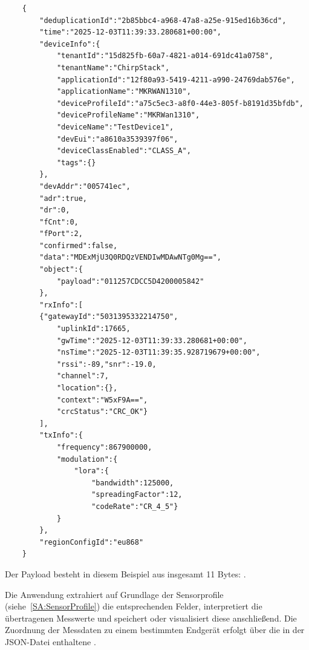 \begin{verbatim}
	{
		"deduplicationId":"2b85bbc4-a968-47a8-a25e-915ed16b36cd",
		"time":"2025-12-03T11:39:33.280681+00:00",
		"deviceInfo":{
			"tenantId":"15d825fb-60a7-4821-a014-691dc41a0758",
			"tenantName":"ChirpStack",
			"applicationId":"12f80a93-5419-4211-a990-24769dab576e",
			"applicationName":"MKRWAN1310",
			"deviceProfileId":"a75c5ec3-a8f0-44e3-805f-b8191d35bfdb",
			"deviceProfileName":"MKRWan1310",
			"deviceName":"TestDevice1",
			"devEui":"a8610a3539397f06",
			"deviceClassEnabled":"CLASS_A",
			"tags":{}
		},
		"devAddr":"005741ec",
		"adr":true,
		"dr":0,
		"fCnt":0,
		"fPort":2,
		"confirmed":false,
		"data":"MDExMjU3Q0RDQzVENDIwMDAwNTg0Mg==",
		"object":{
			"payload":"011257CDCC5D4200005842"
		},
		"rxInfo":[
		{"gatewayId":"5031395332214750",
			"uplinkId":17665,
			"gwTime":"2025-12-03T11:39:33.280681+00:00",
			"nsTime":"2025-12-03T11:39:35.928719679+00:00",
			"rssi":-89,"snr":-19.0,
			"channel":7,
			"location":{},
			"context":"W5xF9A==",
			"crcStatus":"CRC_OK"}
		],
		"txInfo":{
			"frequency":867900000,
			"modulation":{
				"lora":{
					"bandwidth":125000,
					"spreadingFactor":12,
					"codeRate":"CR_4_5"}
			}
		},
		"regionConfigId":"eu868"
	}
\end{verbatim}


	\medskip

	Der Payload besteht in diesem Beispiel aus insgesamt 11 Bytes: . 

	Die Anwendung extrahiert auf Grundlage der Sensorprofile (siehe~\ref{SA:SensorProfile}) die entsprechenden Felder, interpretiert die übertragenen Messwerte und speichert oder visualisiert diese anschlie{\ss}end. Die Zuordnung der Messdaten zu einem bestimmten Endgerät erfolgt über die in der JSON-Datei enthaltene .




%	
%	
%	
%	
